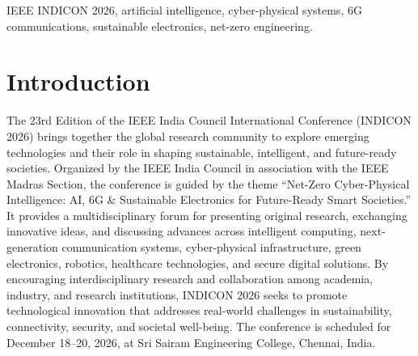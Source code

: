 \documentclass[conference]{IEEEtran}
\begin{document}
\begin{abstract}
The 23rd Edition of the IEEE India Council International Conference (INDICON 2026) provides an international forum for researchers, academicians, industry professionals, and practitioners to present and discuss recent advances in engineering, computing, communication technologies, and emerging interdisciplinary fields. Organized by the IEEE India Council in association with the IEEE Madras Section, the conference focuses on the theme “Net-Zero Cyber-Physical Intelligence: AI, 6G \& Sustainable Electronics for Future-Ready Smart Societies.” The conference encompasses a broad range of research areas, including artificial intelligence and machine learning, next-generation wireless communication, cyber-physical systems, digital twins, sustainable electronics, very-large-scale integration (VLSI), robotics, intelligent control, photonics, quantum technologies, signal processing, biomedical engineering, and information security. INDICON 2026 aims to foster knowledge exchange, encourage interdisciplinary collaboration, and promote innovative technological solutions to address emerging societal and sustainability challenges. The conference will be held from December 18–20, 2026, at Sri Sairam Engineering College, Chennai, India, in a hybrid format, enabling both in-person and virtual participation.
\end{abstract}

\begin{IEEEkeywords}
IEEE INDICON 2026, artificial intelligence, cyber-physical systems, 6G communications, sustainable electronics, net-zero engineering.
\end{IEEEkeywords}

\section{Introduction}
The 23rd Edition of the IEEE India Council International Conference (INDICON 2026) brings together the global research community to explore emerging technologies and their role in shaping sustainable, intelligent, and future-ready societies. Organized by the IEEE India Council in association with the IEEE Madras Section, the conference is guided by the theme “Net-Zero Cyber-Physical Intelligence: AI, 6G \& Sustainable Electronics for Future-Ready Smart Societies.” It provides a multidisciplinary forum for presenting original research, exchanging innovative ideas, and discussing advances across intelligent computing, next-generation communication systems, cyber-physical infrastructure, green electronics, robotics, healthcare technologies, and secure digital solutions. By encouraging interdisciplinary research and collaboration among academia, industry, and research institutions, INDICON 2026 seeks to promote technological innovation that addresses real-world challenges in sustainability, connectivity, security, and societal well-being. The conference is scheduled for December 18–20, 2026, at Sri Sairam Engineering College, Chennai, India. \cite{sarkar2023leaf}
\end{document}
